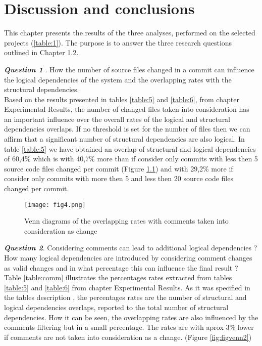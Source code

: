 \chapter{Discussion and conclusions}


\tab This chapter presents the results of the three analyses, performed on the selected projects (\ref{table:1}). The purpose is to answer the three research questions outlined in Chapter 1.2.

\textit{\textbf{Question 1}} . How the number of source files changed in a commit can influence the logical dependencies of the system and the overlapping rates with the structural dependencies.\\
\tab Based on the results presented in tables \ref{table:5} and \ref{table:6}, from chapter Experimental Results, the number of changed files taken into consideration has an important influence over the overall rates of the logical and structural dependencies overlaps. If no threshold is set for the number of files then we can affirm that a significant number of structural dependencies are also logical. In table \ref{table:5} we have obtained an overlap of structural and logical dependencies of 60,4\% which is with 40,7\% more than if consider only commits with less then 5 source code files changed per commit (Figure \ref{fig:figvenn}) and with 29,2\% more if consider only commits with more then 5 and less then 20 source code files changed per commit.
\begin{figure}[h]
\centering
\texttt{[image: fig4.png]}
\caption{Venn diagrams of the overlapping rates with comments taken into consideration as change}
\label{fig:figvenn}
\end{figure}


\textit{\textbf{Question 2}}. Considering comments can lead to additional logical dependencies ? How many logical dependencies are introduced by considering comment changes as valid changes and in what percentage this can influence the final result ?\\

\tab Table \ref{table:comm} illustrates the percentages rates extracted from tables \ref{table:5} and \ref{table:6} from chapter Experimental Results. As it was specified in the tables description , the percentages rates are the number of structural and logical dependencies overlaps, reported to the total number of structural dependencies. How it can be seen, the overlapping rates are also influenced by the comments filtering but in a small percentage. The rates are with aprox 3\% lower if comments are not taken into consideration as a change. (Figure \ref{fig:figvenn2})


